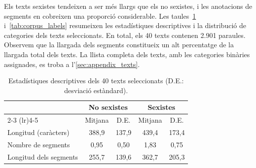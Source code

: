 Els texts sexistes tendeixen a ser més llargs que els no sexistes, i les anotacions de segments en cobreixen una proporció considerable.
Les taules~\ref{tab:corpus_stats} i~\ref{tab:corpus_labels} resumeixen les estadístiques descriptives i la distribució de categories dels texts seleccionats.
En total, els 40 texts contenen 2.901 paraules.
Observem que la llargada dels segments constitueix un alt percentatge de la llargada total dels texts.
La llista completa dels texts, amb les categories binàries assignades, es troba a l'\autoref{sec:appendix_texts}.

\iftables
\begin{table}[ht]
\small
    \centering
    \begin{tabular}{lcccc}
        \toprule & \multicolumn{2}{c}{No sexistes} &
          \multicolumn{2}{c}{Sexistes} \\
        \cmidrule(lr){2-3} \cmidrule(lr){4-5}
        & Mitjana & D.E. & Mitjana & D.E. \\
        \midrule
        Longitud (caràcters)      & 388,9 & 137,9 & 439,4 & 173,4 \\
        Nombre de segments  & 0,95  & 0,50  & 1,83  & 0,75  \\
        Longitud dels segments & 255,7 & 139,6 & 362,7 & 205,3 \\
        \bottomrule
    \end{tabular}
    \caption{Estadístiques descriptives dels 40 texts seleccionats (D.E.:
    desviació estàndard).}\label{tab:corpus_stats}
\end{table}
\fi

